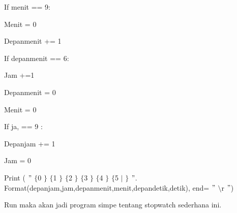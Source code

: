 \noindent 
{\fontsize{14pt}{14pt}\selectfont If menit == 9: \\} \par
\noindent 
{\fontsize{14pt}{14pt}\selectfont Menit = 0 \\} \par
\noindent 
{\fontsize{14pt}{14pt}\selectfont Depanmenit += 1 \\} \par
\noindent 
{\fontsize{14pt}{14pt}\selectfont If depanmenit == 6: \\} \par
\noindent 
{\fontsize{14pt}{14pt}\selectfont Jam +=1 \\} \par
\noindent 
{\fontsize{14pt}{14pt}\selectfont Depanmenit = 0 \\} \par
\noindent 
{\fontsize{14pt}{14pt}\selectfont Menit = 0 \\} \par
\noindent 
{\fontsize{14pt}{14pt}\selectfont If ja, == 9 : \\} \par
\noindent 
{\fontsize{14pt}{14pt}\selectfont Depanjam += 1 \\} \par
\noindent 
{\fontsize{14pt}{14pt}\selectfont Jam = 0 \\} \par
\noindent 
{\fontsize{14pt}{14pt}\selectfont Print ( $ " $ $  \{  $0 $  \}  $ $  \{  $1 $  \}  $ $  \{  $2 $  \}  $ $  \{  $3 $  \}  $ $  \{  $4 $  \}  $ $  \{  $5 $  \vert  $ $  \}  $ $ " $. Format(depanjam,jam,depanmenit,menit,depandetik,detik), end= $ " $ $  \setminus  $r $ " $) \\} \par
\vspace{14pt}
\noindent 
{\fontsize{14pt}{14pt}\selectfont Run maka akan jadi program simpe tentang stopwatch sederhana ini. \\} \par
